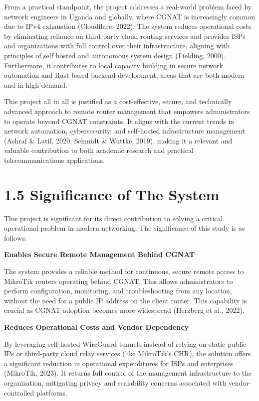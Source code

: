 \documentclass[12pt,a4paper,oneside]{report}
\begin{document}
From a practical standpoint, the project addresses a real-world problem faced by network engineers in Uganda and globally, where CGNAT is increasingly common due to IPv4 exhaustion (Cloudflare, 2022). The system reduces operational costs by eliminating reliance on third-party cloud routing services and provides ISPs and organizations with full control over their infrastructure, aligning with principles of self hosted and autonomous system design (Fielding, 2000). Furthermore, it contributes to local capacity building in secure network automation and Rust-based backend development, areas that are both modern and in high demand.




This project all in all is justified as a cost-effective, secure, and technically advanced approach to remote router management that empowers administrators to operate beyond CGNAT constraints. It aligns with the current trends in network automation\textbf{, }cybersecurity, and self-hosted infrastructure management (Ashraf \& Latif, 2020; Schmidt \& Wuttke, 2019), making it a relevant and valuable contribution to both academic research and practical telecommunications applications.


\section{1.5 Significance of The System}

This project is significant for its direct contribution to solving a critical operational problem in modern networking. The significance of this study is as follows:




\textbf{Enables Secure Remote Management Behind CGNAT}


The system provides a reliable method for continuous, secure remote access to MikroTik routers operating behind CGNAT. This allows administrators to perform configuration, monitoring, and troubleshooting from any location, without the need for a public IP address on the client router. This capability is crucial as CGNAT adoption becomes more widespread (Herzberg et al., 2022).




\textbf{Reduces Operational Costs and Vendor Dependency}


By leveraging self-hosted WireGuard tunnels instead of relying on static public IPs or third-party cloud relay services (like MikroTik's CHR), the solution offers a significant reduction in operational expenditures for ISPs and enterprises (MikroTik, 2023). It returns full control of the management infrastructure to the organization, mitigating privacy and scalability concerns associated with vendor-controlled platforms.
\end{document}
